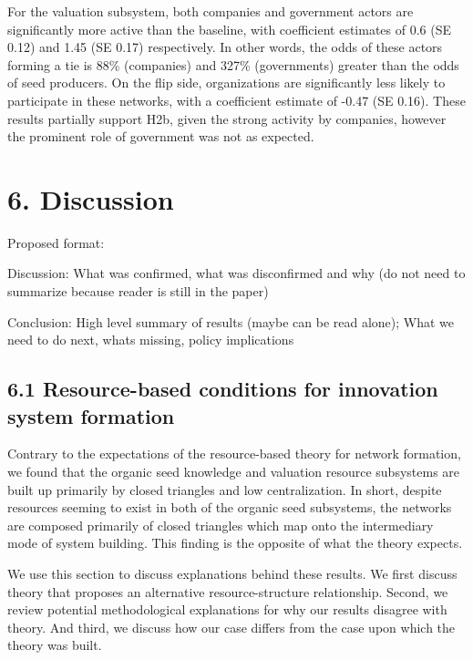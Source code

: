 \documentclass[twoside,12pt,final]{ucthesis-CA2012}
\begin{document}
\begin{ucmainmatter}
For the valuation subsystem, both companies and government actors are
significantly more active than the baseline, with coefficient estimates
of 0.6 (SE 0.12) and 1.45 (SE 0.17) respectively. In other words, the
odds of these actors forming a tie is 88\% (companies) and 327\%
(governments) greater than the odds of seed producers. On the flip side,
organizations are significantly less likely to participate in these
networks, with a coefficient estimate of -0.47 (SE 0.16). These results
partially support H2b, given the strong activity by companies, however
the prominent role of government was not as expected.

\hypertarget{discussion}{%
\section{6. Discussion}\label{discussion}}

Proposed format:

Discussion: What was confirmed, what was disconfirmed and why (do not
need to summarize because reader is still \textquotesingle in the paper\textquotesingle)

Conclusion: High level summary of results (maybe can be read alone);
What we need to do next, what\textquotesingle s missing, policy implications

\hypertarget{resource-based-conditions-for-innovation-system-formation}{%
\subsection{6.1 Resource-based conditions for innovation system formation}\label{resource-based-conditions-for-innovation-system-formation}}

Contrary to the expectations of the resource-based theory for network
formation, we found that the organic seed knowledge and valuation
resource subsystems are built up primarily by closed triangles and low
centralization. In short, despite resources seeming to exist in both of
the organic seed subsystems, the networks are composed primarily of
closed triangles which map onto the intermediary mode of system
building. This finding is the opposite of what the theory expects.

We use this section to discuss explanations behind these results. We
first discuss theory that proposes an alternative resource-structure
relationship. Second, we review potential methodological explanations
for why our results disagree with theory. And third, we discuss how our
case differs from the case upon which the theory was built.


\end{ucmainmatter}
\end{document}
